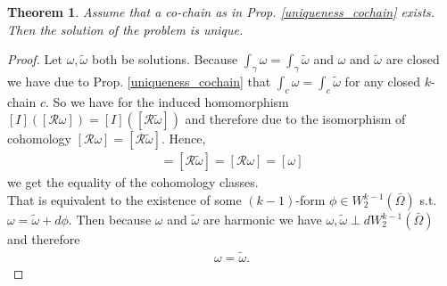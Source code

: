 \documentclass[12pt,a4paper]{article}
\newtheorem{theorem}{Theorem}
\newcommand{\omegabar}{\bar{\Omega}}
\newcommand{\rop}{\mathscr{R}} %
\begin{document}
\begin{theorem}
    Assume that a co-chain as in Prop. \ref{uniqueness_cochain}  exists. 
    Then the solution of the problem is unique.
\end{theorem}
\begin{proof}
    Let $\omega, \tilde{\omega}$ both be solutions. 
    Because $\int_\gamma \omega = \int_\gamma \tilde{\omega}$ and $\omega$ and
    $\tilde{\omega}$ are closed we have due to Prop. \ref{uniqueness_cochain} %
    that $\int_c \omega = \int_c \tilde{\omega}$ for any closed $k$-chain $c$.
    So we have for the induced homomorphism $[I]([\rop \omega]) = 
    [I]([\rop \tilde{\omega}])$ and therefore due to the isomorphism of 
    cohomology $[\rop \omega] = [\rop \tilde{\omega}]$. Hence,
    \begin{align*}
    [\tilde{\omega}] = [\rop \tilde{\omega}] = 
    [\rop \omega] = [\omega]
    \end{align*}
    we get the equality of the cohomology classes. \\
    
    That is equivalent to the
    existence of some $(k-1)$-form $\phi \in W^{k-1}_2(\omegabar)$ s.t.
    $\omega = \tilde{\omega} + d\phi$. Then because $\omega$ and 
    $\tilde{\omega}$ are harmonic we have 
    $\omega, \tilde{\omega} \perp dW^{k-1}_2(\omegabar)$ and therefore 
    \begin{align*}
    \omega = \tilde{\omega}.
    \end{align*}
\end{proof}
\end{document}
